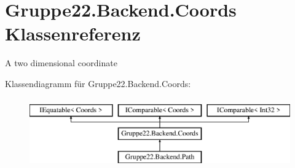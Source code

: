 \hypertarget{class_gruppe22_1_1_backend_1_1_coords}{\section{Gruppe22.\-Backend.\-Coords Klassenreferenz}
\label{class_gruppe22_1_1_backend_1_1_coords}
}


A two dimensional coordinate  


Klassendiagramm für Gruppe22.\-Backend.\-Coords\-:\begin{figure}[H]
\begin{center}
\leavevmode
\includegraphics[height=3.000000cm]{class_gruppe22_1_1_backend_1_1_coords}
\end{center}
\end{figure}

